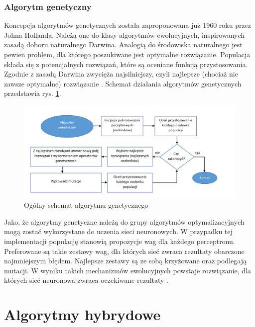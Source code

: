 \documentclass[twoside]{iisthesis}
\begin{document}
	 \subsubsection{Algorytm genetyczny}	
	 		 \label{ss:algorytm_genetyczny}
	 		 
	 		 Koncepcja algorytmów genetycznych została zaproponowana już 1960 roku przez Johna Hollanda. Należą one do klasy algorytmów ewolucyjnych, inspirowanych zasadą doboru naturalnego Darwina. Analogią do środowiska naturalnego jest pewien problem, dla którego poszukiwane jest optymalne rozwiązanie. Populacja składa się z potencjalnych rozwiązań, które są oceniane funkcją przystosowania. Zgodnie z zasadą Darwina zwycięża najsilniejszy, czyli najlepsze (chociaż nie zawsze optymalne) rozwiązanie \cite{pena2000evolutionary}. Schemat działania algorytmów genetycznych przedstawia rys. \ref{fig:algorytmgenetyczny}.	 
	 		 
	 		 
	 		 \begin{figure}[!ht] 
	 		 	\centering
	 		 	\includegraphics[width=1\textwidth]{algorytmgenetyczny}
	 		 	\caption{Ogólny schemat algorytmu genetycznego}
	 		 	\label{fig:algorytmgenetyczny}
	 		 \end{figure}
	 		 
	 		 Jako, że algorytmy genetyczne należą do grupy algorytmów optymalizacyjnych mogą zostać wykorzystane do uczenia sieci neuronowych. W przypadku tej implementacji populację stanowią propozycje wag dla każdego perceptronu. Preferowane są takie zestawy wag, dla których sieć zwraca rezultaty obarczone najmniejszym błędem. Najlepsze zestawy są ze sobą krzyżowane oraz podlegają mutacji. W wyniku takich mechanizmów ewolucyjnych powstaje rozwiązanie, dla których sieć neuronowa zwraca oczekiwane rezultaty \cite{aforgenetgenetic,montana1989training}.
	 		 
	 
	 \section{Algorytmy hybrydowe}
\end{document}
